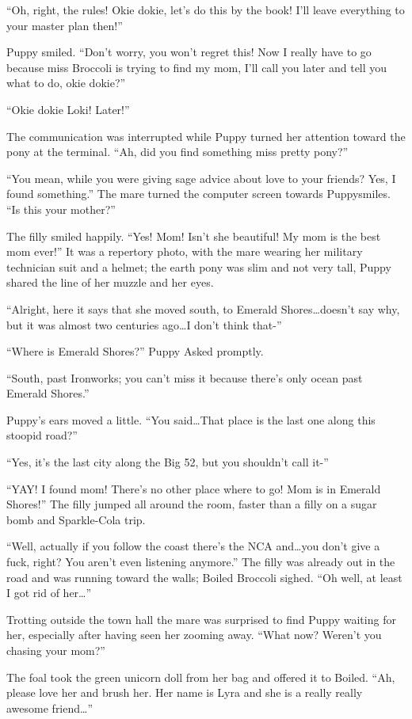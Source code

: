 ``Oh, right, the rules! Okie dokie, let's do this by the book! I'll leave everything to your master plan then!''

Puppy smiled. ``Don't worry, you won't regret this! Now I really have to go because miss Broccoli is trying to find my mom, I'll call you later and tell you what to do, okie dokie?''

``Okie dokie Loki! Later!''

The communication was interrupted while Puppy turned her attention toward the pony at the terminal. ``Ah, did you find something miss pretty pony?''

``You mean, while you were giving sage advice about love to your friends? Yes, I found something.'' The mare turned the computer screen towards Puppysmiles. ``Is this your mother?''

The filly smiled happily. ``Yes! Mom! Isn't she beautiful! My mom is the best mom ever!'' It was a repertory photo, with the mare wearing her military technician suit and a helmet; the earth pony was slim and not very tall, Puppy shared the line of her muzzle and her eyes.

``Alright, here it says that she moved south, to Emerald Shores\dots doesn't say why, but it was almost two centuries ago\dots I don't think that-''

``Where is Emerald Shores?'' Puppy Asked promptly.

``South, past Ironworks; you can't miss it because there's only ocean past Emerald Shores.''

Puppy's ears moved a little. ``You said\dots That place is the last one along this stoopid road?''

``Yes, it's the last city along the Big 52, but you shouldn't call it-''

``YAY! I found mom! There's no other place where to go! Mom is in Emerald Shores!'' The filly jumped all around the room, faster than a filly on a sugar bomb and Sparkle-Cola trip.

``Well, actually if you follow the coast there's the NCA and\dots you don't give a fuck, right? You aren't even listening anymore.'' The filly was already out in the road and was running toward the walls; Boiled Broccoli sighed. ``Oh well, at least I got rid of her\dots''

Trotting outside the town hall the mare was surprised to find Puppy waiting for her, especially after having seen her zooming away. ``What now? Weren't you chasing your mom?''

The foal took the green unicorn doll from her bag and offered it to Boiled. ``Ah, please love her and brush her. Her name is Lyra and she is a really really awesome friend\dots''

